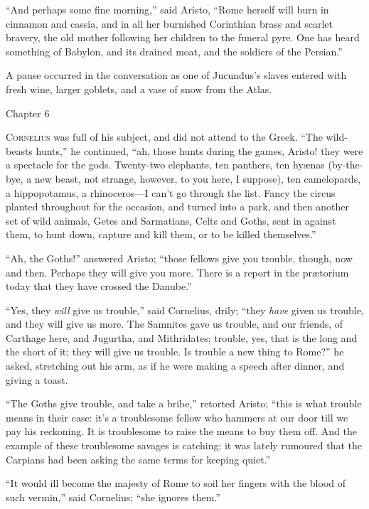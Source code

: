 ``And perhaps some fine morning,'' said Aristo, ``Rome
herself will burn in cinnamon and cassia, and in all her burnished
Corinthian brass and scarlet bravery, the old mother following her
children to the funeral pyre. One has heard something of Babylon, and
its drained moat, and the soldiers of the Persian.''

A pause occurred in the conversation as one of Jucundus's slaves
entered with fresh wine, larger goblets, and a vase of snow from the
Atlas.

Chapter 6


C\textsc{ornelius} was full of his subject, and did not attend to the
Greek. ``The wild-beasts hunts,'' he continued, ``ah,
those hunts during the games, Aristo! they were a spectacle for the
gods. Twenty-two elephants, ten panthers, ten hyænas (by-the-bye, a
new beast, not strange, however, to you here, I suppose), ten
camelopards, a hippopotamus, a rhinoceros—I can't go through the
list. Fancy the circus planted throughout for the occasion, and turned
into a park, and then another set of wild animals, Getes and
Sarmatians, Celts and Goths, sent in against them, to hunt down,
capture and kill them, or to be killed themselves.''

``Ah, the Goths!'' answered Aristo; ``those fellows
give you trouble, though, now and then. Perhaps they will give you
more. There is a report in the prætorium today that they have crossed
the Danube.''

``Yes, they \emph{will} give us trouble,'' said Cornelius, drily;
``they \emph{have} given us trouble, and they will give us more.
The Samnites gave us trouble, and our friends, of Carthage here,
and Jugurtha, and Mithridates; trouble, yes, that is the long and the
short of it; they will give us trouble. Is trouble a new thing to
Rome?'' he asked, stretching out his arm, as if he were making a
speech after dinner, and giving a toast.

``The Goths give trouble, and take a bribe,'' retorted
Aristo; ``this is what trouble means in their case: it's a
troublesome fellow who hammers at our door till we pay his reckoning.
It is troublesome to raise the means to buy them off. And the example
of these troublesome savages is catching; it was lately rumoured that
the Carpians had been asking the same terms for keeping quiet.''

``It would ill become the majesty of Rome to soil her fingers
with the blood of such vermin,'' said Cornelius; ``she ignores
them.''

